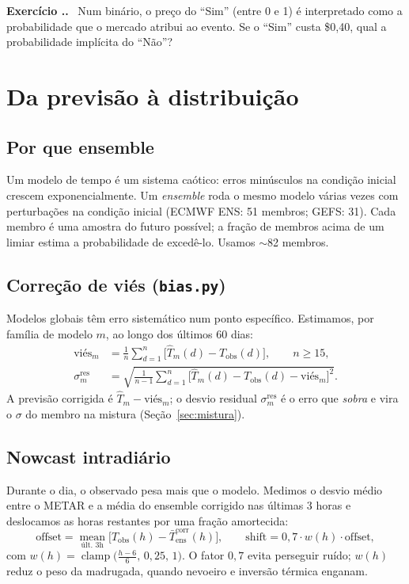 \documentclass[11pt,a4paper]{article}
\newcounter{exc}[section]
\renewcommand{\theexc}{\thesection.\arabic{exc}}
\newenvironment{exercicio}{\refstepcounter{exc}\medskip\noindent
  \textbf{\color{azul}Exercício \theexc.}\ }{\medskip}
\begin{document}
\begin{exercicio}
Num binário, o preço do ``Sim'' (entre 0 e 1) é interpretado como a
probabilidade que o mercado atribui ao evento. Se o ``Sim'' custa \$0,40, qual
a probabilidade implícita do ``Não''?
\end{exercicio}

\section{Da previsão à distribuição}\label{sec:previsao}

\subsection{Por que ensemble}
Um modelo de tempo é um sistema caótico: erros minúsculos na condição inicial
crescem exponencialmente. Um \emph{ensemble} roda o mesmo modelo várias vezes
com perturbações na condição inicial (ECMWF ENS: 51 membros; GEFS: 31). Cada
membro é uma amostra do futuro possível; a fração de membros acima de um limiar
estima a probabilidade de excedê-lo. Usamos $\sim$82 membros.

\subsection{Correção de viés (\texttt{bias.py})}
Modelos globais têm erro sistemático num ponto específico. Estimamos, por
família de modelo $m$, ao longo dos últimos 60 dias:
\begin{align}
  \text{viés}_m &= \frac{1}{n}\sum_{d=1}^{n}\bigl[\hat T_m(d) - T_{\text{obs}}(d)\bigr],
    \qquad n \ge 15,\\
  \sigma^{\text{res}}_m &= \sqrt{\tfrac{1}{n-1}\sum_{d=1}^{n}
    \bigl[\hat T_m(d) - T_{\text{obs}}(d) - \text{viés}_m\bigr]^2 }.
\end{align}
A previsão corrigida é $\hat T_m - \text{viés}_m$; o desvio residual
$\sigma^{\text{res}}_m$ é o erro que \emph{sobra} e vira o $\sigma$ do membro na
mistura (Seção~\ref{sec:mistura}).

\subsection{Nowcast intradiário}
Durante o dia, o observado pesa mais que o modelo. Medimos o desvio médio entre
o METAR e a média do ensemble corrigido nas últimas 3 horas e deslocamos as
horas restantes por uma fração amortecida:
\begin{equation}
  \text{offset} = \operatorname*{mean}_{\text{últ. 3h}}
    \bigl[T_{\text{obs}}(h) - \bar T^{\text{corr}}_{\text{ens}}(h)\bigr],
  \qquad
  \text{shift} = 0{,}7 \cdot w(h)\cdot \text{offset},
\end{equation}
com $w(h)=\operatorname{clamp}\!\bigl(\tfrac{h-6}{6},\,0{,}25,\,1\bigr)$. O
fator $0{,}7$ evita perseguir ruído; $w(h)$ reduz o peso da madrugada, quando
nevoeiro e inversão térmica enganam.
\end{document}
